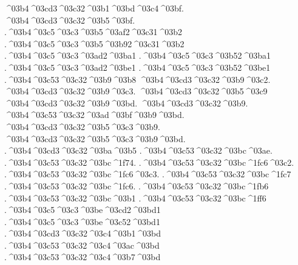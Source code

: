 {	^^^^03b4^^^^03cd3^^^^03c32^^^^03b1^^^^03bd^^^^03c4^^^^03bf.  		%
	^^^^03b4^^^^03cd3^^^^03c32^^^^03b5^^^^03bf. 		%
.^^^^03b4^^^^03c5^^^^03c3^^^^03b5^^^^03af2^^^^03c31^^^^03b2 		%
.^^^^03b4^^^^03c5^^^^03c3^^^^03b5^^^^03b92^^^^03c31^^^^03b2
.^^^^03b4^^^^03c5^^^^03c3^^^^03ad2^^^^03ba1  		%
.^^^^03b4^^^^03c5^^^^03c3^^^^03b52^^^^03ba1
.^^^^03b4^^^^03c5^^^^03c3^^^^03ad2^^^^03be1  		%
.^^^^03b4^^^^03c5^^^^03c3^^^^03b52^^^^03be1
	.^^^^03b4^^^^03c53^^^^03c32^^^^03b9^^^^03b8    		%
	^^^^03b4^^^^03cd3^^^^03c32^^^^03b9^^^^03c2.		%
	^^^^03b4^^^^03cd3^^^^03c32^^^^03b9^^^^03c3.
	^^^^03b4^^^^03cd3^^^^03c32^^^^03b5^^^^03c9
	^^^^03b4^^^^03cd3^^^^03c32^^^^03b9^^^^03bd.
	^^^^03b4^^^^03cd3^^^^03c32^^^^03b9.
	^^^^03b4^^^^03c53^^^^03c32^^^^03ad^^^^03bf^^^^03b9^^^^03bd.
	^^^^03b4^^^^03cd3^^^^03c32^^^^03b5^^^^03c3^^^^03b9.
	^^^^03b4^^^^03cd3^^^^03c32^^^^03b5^^^^03c3^^^^03b9^^^^03bd.
	.^^^^03b4^^^^03cd3^^^^03c32^^^^03ba^^^^03b5   		%
	.^^^^03b4^^^^03c53^^^^03c32^^^^03bc^^^^03ae.  		%
	.^^^^03b4^^^^03c53^^^^03c32^^^^03bc^^^^1f74.
	.^^^^03b4^^^^03c53^^^^03c32^^^^03bc^^^^1fc6^^^^03c2.
	.^^^^03b4^^^^03c53^^^^03c32^^^^03bc^^^^1fc6^^^^03c3.
	.^^^^03b4^^^^03c53^^^^03c32^^^^03bc^^^^1fc7
	.^^^^03b4^^^^03c53^^^^03c32^^^^03bc^^^^1fc6.
	.^^^^03b4^^^^03c53^^^^03c32^^^^03bc^^^^1fb6    		
	.^^^^03b4^^^^03c53^^^^03c32^^^^03bc^^^^03b1   		
	.^^^^03b4^^^^03c53^^^^03c32^^^^03bc^^^^1ff6
.^^^^03b4^^^^03c5^^^^03c3^^^^03be^^^^03cd2^^^^03bd1  		%
.^^^^03b4^^^^03c5^^^^03c3^^^^03be^^^^03c52^^^^03bd1
	.^^^^03b4^^^^03cd3^^^^03c32^^^^03c4^^^^03b1^^^^03bd  		%
	.^^^^03b4^^^^03c53^^^^03c32^^^^03c4^^^^03ac^^^^03bd
	.^^^^03b4^^^^03c53^^^^03c32^^^^03c4^^^^03b7^^^^03bd  		%
}
